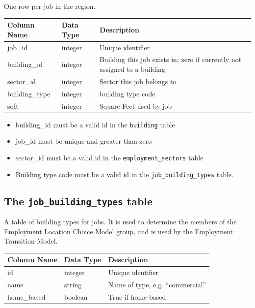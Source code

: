 One row per job in the region.

\begin{tabular}{lll}
\textbf{Column Name} & \textbf{Data Type} & \textbf{Description} \\
\hline
job_id & integer & Unique identifier  \\
\hline
building_id & integer & Building  this job exists in; zero if currently not assigned to a building  \\
\hline
sector_id & integer & Sector this job belongs to  \\\hline
building_type & integer & building type code \\ \hline
sqft & integer & Square Feet used by job \\
\hline

\end{tabular}

\begin{itemize} \tight
\item building_id must be a valid id in the \verb|building| table
\item job_id must be unique and greater than zero
\item sector_id must be a valid id in the \verb|employment_sectors| table
\item Building type code must be a valid id in the \verb|job_building_types| table.
\end{itemize}


\subsection{The {\tt job_building_types} table}

A table of building types for jobs.  It is used to determine the members
of the Employment Location Choice Model group, and is used by the Employment
Transition Model.

\begin{tabular}{lll}
\textbf{Column Name} & \textbf{Data Type} & \textbf{Description} \\
\hline
id & integer & Unique identifier  \\
\hline
name & string & Name of type, e.g. ``commercial''  \\ \hline
home_based & boolean & True if home-based  \\
\hline
\end{tabular}

